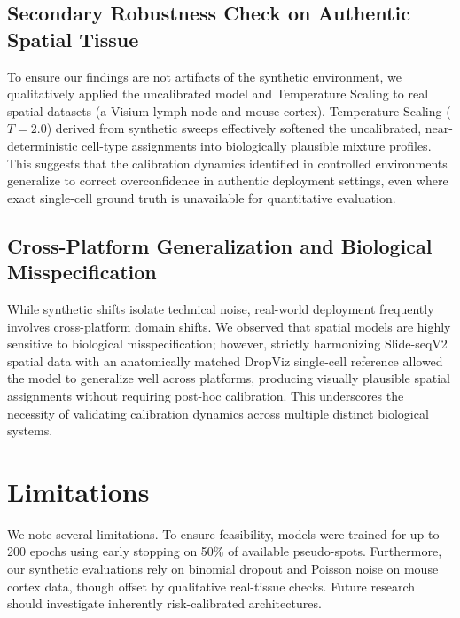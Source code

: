 \documentclass{jmlr} %
\begin{document}
\subsection{Secondary Robustness Check on Authentic Spatial Tissue}
To ensure our findings are not artifacts of the synthetic environment, we qualitatively applied the uncalibrated model and Temperature Scaling to real spatial datasets (a Visium lymph node and mouse cortex). Temperature Scaling ($T=2.0$) derived from synthetic sweeps effectively softened the uncalibrated, near-deterministic cell-type assignments into biologically plausible mixture profiles. This suggests that the calibration dynamics identified in controlled environments generalize to correct overconfidence in authentic deployment settings, even where exact single-cell ground truth is unavailable for quantitative evaluation.

\subsection{Cross-Platform Generalization and Biological Misspecification}
While synthetic shifts isolate technical noise, real-world deployment frequently involves cross-platform domain shifts. We observed that spatial models are highly sensitive to biological misspecification; however, strictly harmonizing Slide-seqV2 spatial data with an anatomically matched DropViz single-cell reference allowed the model to generalize well across platforms, producing visually plausible spatial assignments without requiring post-hoc calibration. This underscores the necessity of validating calibration dynamics across multiple distinct biological systems.

\section{Limitations}
\label{sec:limitations}
We note several limitations. To ensure feasibility, models were trained for up to 200 epochs using early stopping on 50\% of available pseudo-spots. Furthermore, our synthetic evaluations rely on binomial dropout and Poisson noise on mouse cortex data, though offset by qualitative real-tissue checks. Future research should investigate inherently risk-calibrated architectures.
\end{document}
